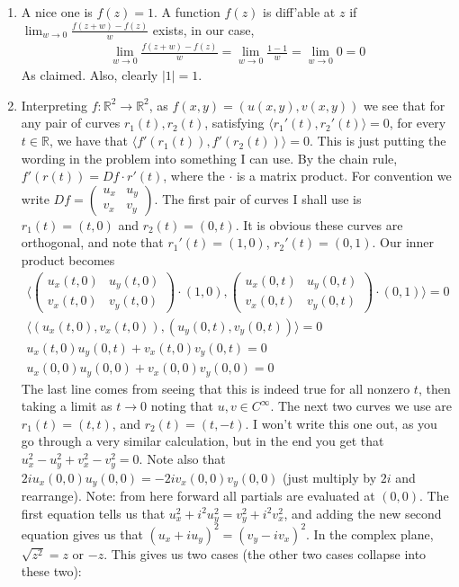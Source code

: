 \documentclass[12pt]{article}
\def\mbb#1{\mathbb{#1}}
\def \R{\mbb{R}}
\theoremstyle{definition}
\theoremstyle{remark}
\renewcommand{\ip}[2]{\langle #1, #2 \rangle}
\begin{document}
\begin{enumerate}[leftmargin=\labelsep]
		\item A nice one is $f(z) = 1$. A function $f(z)$ is diff'able at $z$ if $\lim_{w \to 0} \frac{f(z+w)-f(z)}{w}$ exists, in our case, 
		\begin{align*}
			\lim_{w \to 0} \frac{f(z+w)-f(z)}{w} = \lim_{w \to 0} \frac{1 - 1}{w} = \lim_{w \to 0} 0 = 0
		\end{align*}
		As claimed. Also, clearly $|1| = 1$.
		
		\item Interpreting $f: \R^2 \to \R^2$, as $f(x, y) = (u(x, y), v(x, y))$ we see that for any pair of curves $r_1(t), r_2(t)$, satisfying $\ip{r_1'(t)}{r_2'(t)} = 0$, for every $t \in \R$, we have that $\ip{f'(r_1(t))}{f'(r_2(t))} = 0$. This is just putting the wording in the problem into something I can use. By the chain rule, $f'(r(t)) = Df \cdot r'(t)$, where the $\cdot$ is a matrix product. For convention we write $Df = \begin{pmatrix}
			u_x & u_y \\
			v_x & v_y
		\end{pmatrix}$. The first pair of curves I shall use is $r_1(t) = (t, 0)$ and $r_2(t) = (0, t)$. It is obvious these curves are orthogonal, and note that $r_1'(t) = (1, 0)$, $r_2'(t) = (0, 1)$. Our inner product becomes 
		\begin{align*}
			\ip{\begin{pmatrix} u_x(t,0) & u_y(t, 0) \\ v_x(t, 0) & v_y(t, 0) \end{pmatrix} \cdot (1, 0)}{\begin{pmatrix} u_x(0,t) & u_y(0, t) \\ v_x(0, t) & v_y(0, t) \end{pmatrix} \cdot (0, 1)} = 0 \\
			\ip{(u_x(t, 0), v_x(t, 0))}{(u_y(0, t), v_y(0, t))} = 0 \\
			u_x(t, 0)u_y(0, t) + v_x(t, 0)v_y(0, t) = 0 \\
			u_x(0, 0)u_y(0, 0) + v_x(0, 0)v_y(0, 0) = 0
		\end{align*}
		The last line comes from seeing that this is indeed true for all nonzero $t$, then taking a limit as $t \to 0$ noting that $u, v \in C^\infty$. The next two curves we use are $r_1(t) = (t, t)$, and $r_2(t) = (t, -t)$. I won't write this one out, as you go through a very similar calculation, but in the end you get that $u_x^2 - u_y^2 + v_x^2 - v_y^2 = 0$. Note also that $2iu_x(0, 0)u_y(0, 0)  = -2iv_x(0, 0)v_y(0, 0)$ (just multiply by $2i$ and rearrange). Note: from here forward all partials are evaluated at $(0, 0)$. The first equation tells us that $u_x^2 + i^2u_y^2 = v_y^2 + i^2v_x^2$, and adding the new second equation gives us that $(u_x+iu_y)^2 = (v_y-iv_x)^2$. In the complex plane, $\sqrt{z^2} = z$ or $-z$. This gives us two cases (the other two cases collapse into these two):

\end{enumerate}
\end{document}
